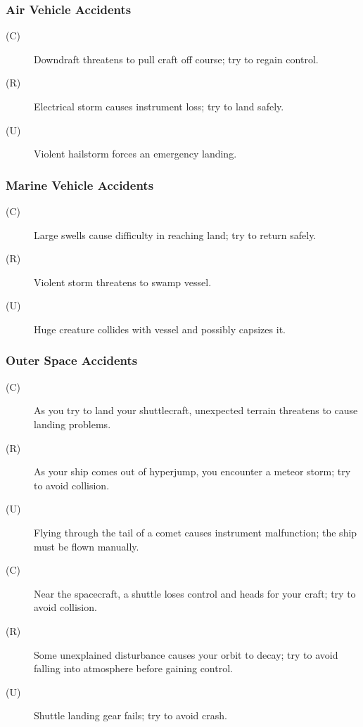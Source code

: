\subsubsection*{Air Vehicle Accidents}
\label{sec:air-vehicle-accid}


\begin{description}
\item[(C)] Downdraft threatens to pull craft off course; try to regain
  control.
\item[(R)] Electrical storm causes instrument loss; try to land
  safely.
\item[(U)] Violent hailstorm forces an emergency landing.
\end{description}


\subsubsection*{Marine Vehicle Accidents}
\label{sec:marine-vehicle-accid}


\begin{description}
\item[(C)] Large swells cause difficulty in reaching land; try to
  return safely.
\item[(R)] Violent storm threatens to swamp vessel.
\item[(U)] Huge creature collides with vessel and possibly capsizes
  it.
\end{description}


\subsubsection*{Outer Space Accidents}
\label{sec:outer-space-accid}

\begin{description}
\item[(C)] As you try to land your shuttlecraft, unexpected terrain
  threatens to cause landing problems.
\item[(R)] As your ship comes out of hyperjump, you encounter a meteor
  storm; try to avoid collision.
\item[(U)] Flying through the tail of a comet causes instrument
  malfunction; the ship must be flown manually.
\item[(C)] Near the spacecraft, a shuttle loses control and heads for
  your craft; try to avoid collision.
\item[(R)] Some unexplained disturbance causes your orbit to decay;
  try to avoid falling into atmosphere before gaining control.
\item[(U)] Shuttle landing gear fails; try to avoid crash.
\end{description}


